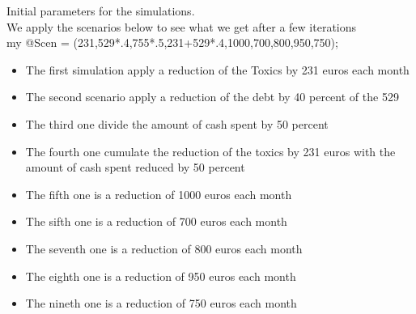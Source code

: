 \documentclass[8pt]{article} %
\begin{document}
Initial parameters for the simulations.\\


We apply the scenarios below to see what we get after a few iterations\\


my @Scen = (231,529*.4,755*.5,231+529*.4,1000,700,800,950,750);\\

\begin{itemize}
	\item{The first simulation apply a reduction of the Toxics by 231 euros each month}
	\item{The second scenario apply a reduction of the debt by 40 percent of the 529}
	\item{The third one divide the amount of cash spent by 50 percent}
	\item{The fourth one cumulate the reduction of the toxics by 231 euros with the amount of cash spent reduced by 50 percent}
	\item{The fifth one is a reduction of 1000 euros each month}
	\item{The sifth one is a reduction of 700 euros each month}
	\item{The seventh one is a reduction of 800 euros each month}
	\item{The eighth one is a reduction of 950 euros each month}
	\item{The nineth one is a reduction of 750 euros each month}
\end{itemize}
\end{document}
